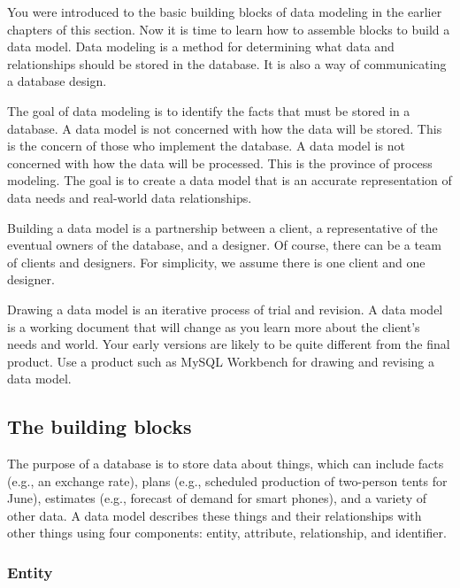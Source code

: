 \documentclass[
]{article}
\begin{document}
You were introduced to the basic building blocks of data modeling in the
earlier chapters of this section. Now it is time to learn how to
assemble blocks to build a data model. Data modeling is a method for
determining what data and relationships should be stored in the
database. It is also a way of communicating a database design.

The goal of data modeling is to identify the facts that must be stored
in a database. A data model is not concerned with how the data will be
stored. This is the concern of those who implement the database. A data
model is not concerned with how the data will be processed. This is the
province of process modeling. The goal is to create a data model that is
an accurate representation of data needs and real-world data
relationships.

Building a data model is a partnership between a client, a
representative of the eventual owners of the database, and a designer.
Of course, there can be a team of clients and designers. For simplicity,
we assume there is one client and one designer.

Drawing a data model is an iterative process of trial and revision. A
data model is a working document that will change as you learn more
about the client's needs and world. Your early versions are likely to be
quite different from the final product. Use a product such as MySQL
Workbench for drawing and revising a data model.

\hypertarget{the-building-blocks}{%
\subsection*{The building blocks}\label{the-building-blocks}}

The purpose of a database is to store data about things, which can
include facts (e.g., an exchange rate), plans (e.g., scheduled
production of two-person tents for June), estimates (e.g., forecast of
demand for smart phones), and a variety of other data. A data model
describes these things and their relationships with other things using
four components: entity, attribute, relationship, and identifier.

\hypertarget{entity}{%
\subsubsection*{Entity}\label{entity}}
\end{document}
